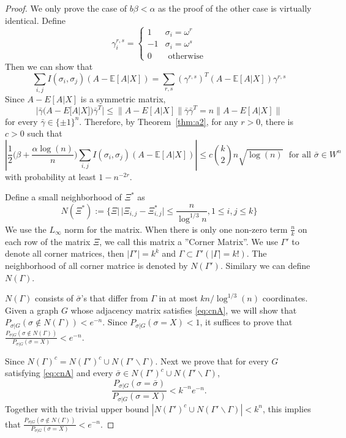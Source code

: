 \documentclass{article}
\begin{document}
\begin{proof}
We only prove the case of $b\beta <\alpha$ as the proof of the other case is virtually identical.
Define
$$
\gamma^{r,s}_i = \begin{cases}
1 & \sigma_i = \omega^r \\
-1 & \sigma_i = \omega^s \\
0 & \textrm{ otherwise}
\end{cases}
$$
Then we can show that
$$
\sum_{i,j} I(\sigma_i, \sigma_j) (A-\mathbb{E}[A|X]) = \sum_{r,s} (\gamma^{r,s})^T (A-\mathbb{E}[A|X])\gamma^{r,s}
$$
Since $A-E[A|X]$ is a symmetric matrix,
$$
|\bar{\gamma}  (A-E[A|X]) \bar{\gamma}^T|\le
\|A-E[A|X]\| \bar{\gamma} \bar{\gamma}^T=n \|A-E[A|X]\|
$$
for every $\bar{\gamma}\in\{\pm 1\}^n$.
Therefore, by Theorem~\ref{thm:a2}, for any $r>0$, there is $c>0$ such that
\begin{equation} \label{eq:cnA}
\left|\frac{1}{2} \big(\beta+\frac{\alpha\log(n)}{n} \big)\sum_{i,j} I(\sigma_i, \sigma_j) (A-\mathbb{E}[A|X]) 
\right| \le c\binom{k}{2} n \sqrt{\log(n)}
  \text{~~for all~} \bar{\sigma}\in W^n
\end{equation}
with probability at least $1-n^{-2r}$.

Define a small neighborhood of $\Xi^*$ as
$$
N(\Xi^*) := \{\Xi |\, |\Xi_{i,j} - \Xi^*_{i,j}| \leq \frac{n}{\log^{1/3} n}, 1\leq i,j\leq k\}
$$
We use the $L_{\infty}$ norm for the matrix.
 When there is only one non-zero term $\frac{n}{k}$ on each row of the matrix $\Xi$, we call this matrix a ''Corner Matrix''.
 We use $\Gamma'$ to denote all corner matrices, then $|\Gamma'|=k^k$ and $\Gamma \subset \Gamma' (|\Gamma| = k!)$. The neighborhood of all corner matrice is denoted by $N(\Gamma')$. Similary we can define $N(\Gamma)$. 

$N(\Gamma)$ consists of $\bar{\sigma}$'s that differ from $\Gamma$ in at most $kn/\log^{1/3}(n)$ coordinates.
Given a graph $G$ whose adjacency matrix satisfies \eqref{eq:cnA}, we will show that $P_{\sigma|G}(\sigma\notin N(\Gamma))< e^{-n}$. Since $P_{\sigma|G}(\sigma=X)<1$, it suffices to prove that
$\frac{P_{\sigma|G}(\sigma\notin N(\Gamma))}{P_{\sigma|G}(\sigma=X)}<e^{-n}$. 

Since  $N(\Gamma)^c=N(\Gamma')^c\cup N(\Gamma' \backslash \Gamma)$.
Next we prove that for every $G$ satisfying \eqref{eq:cnA} and every
$\bar{\sigma}\in N(\Gamma')^c\cup N(\Gamma' \backslash \Gamma)$, 
\begin{equation} \label{eq:xmb}
\frac{P_{\sigma|G}(\sigma=\bar{\sigma})}{P_{\sigma|G}(\sigma=X)}<k^{-n}e^{-n} .
\end{equation}
Together with the trivial upper bound $|N(\Gamma')^c\cup N(\Gamma' \backslash \Gamma)|<k^n$, this implies that $\frac{P_{\sigma|G}(\sigma\notin N(\Gamma))}{P_{\sigma|G}(\sigma=X)}<e^{-n}$.


\end{proof}
\end{document}
